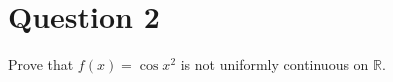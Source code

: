\documentclass[11pt]{article} %
\begin{document}
	
	\section{Question 2}
	Prove that $f(x) = \cos{x^2}$ is not uniformly continuous on $\mathbb{R}$.
	
\end{document}
